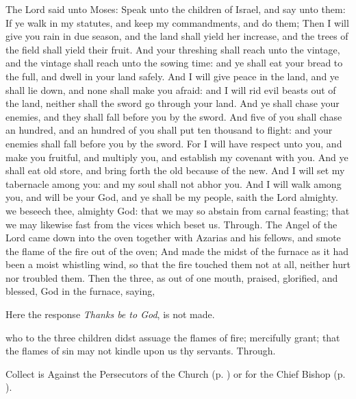  The Lord said unto Moses: Speak unto the children of Israel, and say unto them: If ye walk in my statutes, and keep my commandments, and do them; Then I will give you rain in due season, and the land shall yield her increase, and the trees of the field shall yield their fruit. And your threshing shall reach unto the vintage, and the vintage shall reach unto the sowing time: and ye shall eat your bread to the full, and dwell in your land safely. And I will give peace in the land, and ye shall lie down, and none shall make you afraid: and I will rid evil beasts out of the land, neither shall the sword go through your land. And ye shall chase your enemies, and they shall fall before you by the sword. And five of you shall chase an hundred, and an hundred of you shall put ten thousand to flight: and your enemies shall fall before you by the sword. For I will have respect unto you, and make you fruitful, and multiply you, and establish my covenant with you. And ye shall eat old store, and bring forth the old because of the new. And I will set my tabernacle among you: and my soul shall not abhor you. And I will walk among you, and will be your God, and ye shall be my people, saith the Lord almighty.
\collect
{} we beseech thee, almighty God: that we may so abstain from carnal feasting; that we may likewise fast from the vices which beset us. Through.
 The Angel of the Lord came down into the oven together with Azarias and his fellows, and smote the flame of the fire out of the oven; And made the midst of the furnace as it had been a moist whistling wind, so that the fire touched them not at all, neither hurt nor troubled them. Then the three, as out of one mouth, praised, glorified, and blessed, God in the furnace, saying,
\begin{rubric}
    Here the response \emph{Thanks be to God}, is not made.
\end{rubric}

\vspace{-0.5ex}

\collect
{} who to the three children didst assuage the flames of fire; mercifully grant; that the flames of sin may not kindle upon us thy servants. Through.
\begin{rubric}
     Collect is Against the Persecutors of the Church (p. \pageref{SPAgainst}) or for the Chief Bishop (p. \pageref{SPChiefBishop}).
\end{rubric}

